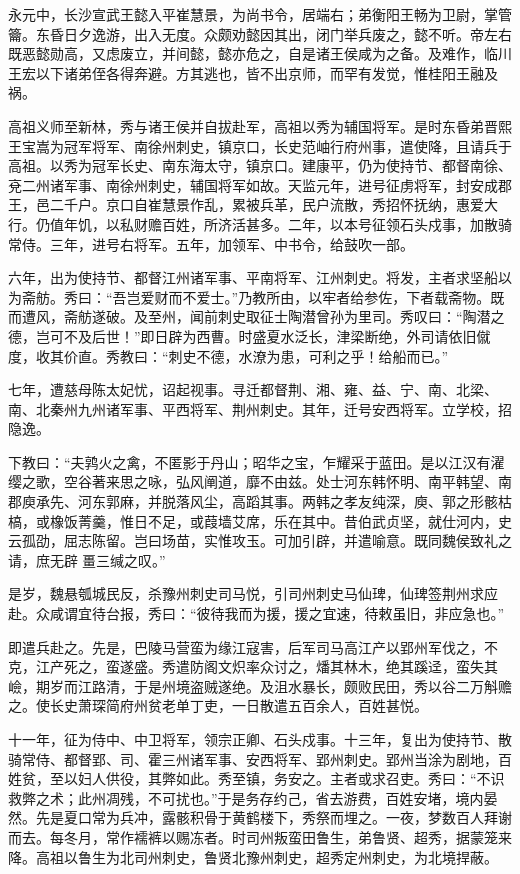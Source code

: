 \documentclass[12pt,UTF8]{ctexbook}
\begin{document}
永元中，长沙宣武王懿入平崔慧景，为尚书令，居端右；弟衡阳王畅为卫尉，掌管籥。东昏日夕逸游，出入无度。众颇劝懿因其出，闭门举兵废之，懿不听。帝左右既恶懿勋高，又虑废立，并间懿，懿亦危之，自是诸王侯咸为之备。及难作，临川王宏以下诸弟侄各得奔避。方其逃也，皆不出京师，而罕有发觉，惟桂阳王融及祸。

高祖义师至新林，秀与诸王侯并自拔赴军，高祖以秀为辅国将军。是时东昏弟晋熙王宝嵩为冠军将军、南徐州刺史，镇京口，长史范岫行府州事，遣使降，且请兵于高祖。以秀为冠军长史、南东海太守，镇京口。建康平，仍为使持节、都督南徐、兗二州诸军事、南徐州刺史，辅国将军如故。天监元年，进号征虏将军，封安成郡王，邑二千户。京口自崔慧景作乱，累被兵革，民户流散，秀招怀抚纳，惠爱大行。仍值年饥，以私财赡百姓，所济活甚多。二年，以本号征领石头戍事，加散骑常侍。三年，进号右将军。五年，加领军、中书令，给鼓吹一部。

六年，出为使持节、都督江州诸军事、平南将军、江州刺史。将发，主者求坚船以为斋舫。秀曰：“吾岂爱财而不爱士。”乃教所由，以牢者给参佐，下者载斋物。既而遭风，斋舫遂破。及至州，闻前刺史取征士陶潜曾孙为里司。秀叹曰：“陶潜之德，岂可不及后世！”即日辟为西曹。时盛夏水泛长，津梁断绝，外司请依旧僦度，收其价直。秀教曰：“刺史不德，水潦为患，可利之乎！给船而已。”

七年，遭慈母陈太妃忧，诏起视事。寻迁都督荆、湘、雍、益、宁、南、北梁、南、北秦州九州诸军事、平西将军、荆州刺史。其年，迁号安西将军。立学校，招隐逸。

下教曰：“夫鹑火之禽，不匿影于丹山；昭华之宝，乍耀采于蓝田。是以江汉有濯缨之歌，空谷著来思之咏，弘风阐道，靡不由兹。处士河东韩怀明、南平韩望、南郡庾承先、河东郭麻，并脱落风尘，高蹈其事。两韩之孝友纯深，庾、郭之形骸枯槁，或橡饭菁羹，惟日不足，或葭墙艾席，乐在其中。昔伯武贞坚，就仕河内，史云孤劭，屈志陈留。岂曰场苗，实惟攻玉。可加引辟，并遣喻意。既同魏侯致礼之请，庶无辟畺三缄之叹。”

是岁，魏悬瓠城民反，杀豫州刺史司马悦，引司州刺史马仙琕，仙琕签荆州求应赴。众咸谓宜待台报，秀曰：“彼待我而为援，援之宜速，待敕虽旧，非应急也。”

即遣兵赴之。先是，巴陵马营蛮为缘江寇害，后军司马高江产以郢州军伐之，不克，江产死之，蛮遂盛。秀遣防阁文炽率众讨之，燔其林木，绝其蹊迳，蛮失其嶮，期岁而江路清，于是州境盗贼遂绝。及沮水暴长，颇败民田，秀以谷二万斛赡之。使长史萧琛简府州贫老单丁吏，一日散遣五百余人，百姓甚悦。

十一年，征为侍中、中卫将军，领宗正卿、石头戍事。十三年，复出为使持节、散骑常侍、都督郢、司、霍三州诸军事、安西将军、郢州刺史。郢州当涂为剧地，百姓贫，至以妇人供役，其弊如此。秀至镇，务安之。主者或求召吏。秀曰：“不识救弊之术；此州凋残，不可扰也。”于是务存约己，省去游费，百姓安堵，境内晏然。先是夏口常为兵冲，露骸积骨于黄鹤楼下，秀祭而埋之。一夜，梦数百人拜谢而去。每冬月，常作襦裤以赐冻者。时司州叛蛮田鲁生，弟鲁贤、超秀，据蒙笼来降。高祖以鲁生为北司州刺史，鲁贤北豫州刺史，超秀定州刺史，为北境捍蔽。
\end{document}
